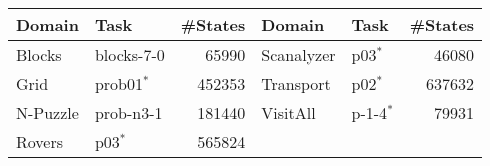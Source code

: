 \begin{tabular}{llr|llr}
    Domain & Task & \#States & Domain & Task & \#States \\ 
    \midrule
    Blocks & blocks-7-0 & 65990 & Scanalyzer & p03$^*$ & 46080 \\
    Grid & prob01$^*$ & 452353 & Transport & p02$^*$ & 637632 \\
    N-Puzzle & prob-n3-1 & 181440 & VisitAll & p-1-4$^*$ & 79931 \\
    Rovers & p03$^*$ & 565824 & & & \\
\end{tabular}
